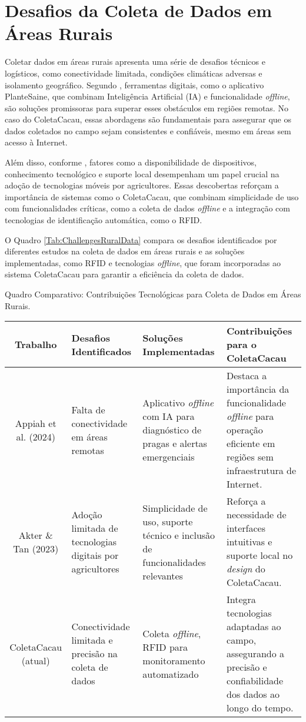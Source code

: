\section{Desafios da Coleta de Dados em Áreas Rurais}
Coletar dados em áreas rurais apresenta uma série de desafios técnicos e logísticos, como conectividade limitada, condições climáticas adversas e isolamento geográfico. Segundo \cite{Appiah2024PlanteSaineAA}, ferramentas digitais, como o aplicativo PlanteSaine, que combinam Inteligência Artificial (IA) e funcionalidade \textit{offline}, são soluções promissoras para superar esses obstáculos em regiões remotas. No caso do ColetaCacau, essas abordagens são fundamentais para assegurar que os dados coletados no campo sejam consistentes e confiáveis, mesmo em áreas sem acesso à Internet.

Além disso, conforme \cite{Akter2023AgroBasedMA}, fatores como a disponibilidade de dispositivos, conhecimento tecnológico e suporte local desempenham um papel crucial na adoção de tecnologias móveis por agricultores. Essas descobertas reforçam a importância de sistemas como o ColetaCacau, que combinam simplicidade de uso com funcionalidades críticas, como a coleta de dados \textit{offline} e a integração com tecnologias de identificação automática, como o RFID.

O Quadro \ref{Tab:ChallengesRuralData} compara os desafios identificados por diferentes estudos na coleta de dados em áreas rurais e as soluções implementadas, como RFID e tecnologias \textit{offline}, que foram incorporadas ao sistema ColetaCacau para garantir a eficiência da coleta de dados.

\begin{quadro}[!htb]
    \centering
    \footnotesize
    \caption{Quadro Comparativo: Contribuições Tecnológicas para Coleta de Dados em Áreas Rurais.}
    \begin{tabular}{|c|p{3cm}|p{3cm}|p{5cm}|}
       \hline
       \textbf{Trabalho} & \centering\textbf{Desafios Identificados} & \textbf{Soluções Implementadas} & \textbf{Contribuições para o ColetaCacau}\\
       \hline
       Appiah et al. (2024) & Falta de conectividade em áreas remotas & Aplicativo \textit{offline} com IA para diagnóstico de pragas e alertas emergenciais & Destaca a importância da funcionalidade \textit{offline} para operação eficiente em regiões sem infraestrutura de Internet. \\ 
       \hline
       Akter \& Tan (2023) & Adoção limitada de tecnologias digitais por agricultores & Simplicidade de uso, suporte técnico e inclusão de funcionalidades relevantes & Reforça a necessidade de interfaces intuitivas e suporte local no \textit{design} do ColetaCacau. \\ 
       \hline
       ColetaCacau (atual) & Conectividade limitada e precisão na coleta de dados & Coleta \textit{offline}, RFID para monitoramento automatizado & Integra tecnologias adaptadas ao campo, assegurando a precisão e confiabilidade dos dados ao longo do tempo. \\ 
       \hline
    \end{tabular}
    \label{Tab:ChallengesRuralData}
\end{quadro}

